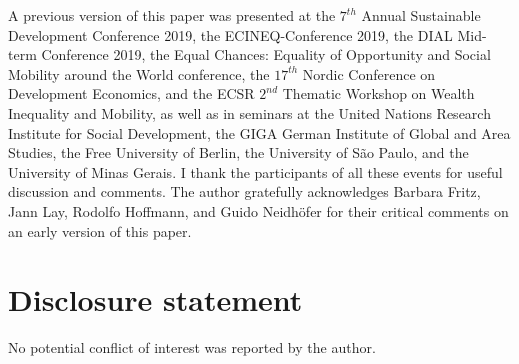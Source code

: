 \documentclass[a4paper, 12pt]{article}
\begin{document}
\footnotesize A previous version of this paper was presented at the $7^{th}$ Annual Sustainable Development Conference 2019, the ECINEQ-Conference 2019, the DIAL Mid-term Conference 2019, the Equal Chances: Equality of Opportunity and Social Mobility around the World conference, the $17^{th}$ Nordic Conference on Development Economics, and the ECSR $2^{nd}$ Thematic Workshop on Wealth Inequality and Mobility, as well as in seminars at the United Nations Research Institute for Social Development, the GIGA German Institute of Global and Area Studies, the Free University of Berlin, the University of São Paulo, and the University of Minas Gerais. I thank the participants of all these events for useful discussion and comments. The author gratefully acknowledges Barbara Fritz, Jann Lay, Rodolfo Hoffmann, and Guido Neidhöfer for their critical comments on an early version of this paper. 





\section*{Disclosure statement}

No potential conflict of interest was reported by the author.





\theendnotes



\let\oldthebibliography\thebibliography
\let\endoldthebibliography\endthebibliography
\renewenvironment{thebibliography}[1]{
  \begin{oldthebibliography}{#1}
    \setlength{\itemsep}{0em}
    \setlength{\parskip}{0em}
}
{
  \end{oldthebibliography}
}

{\footnotesize

}

\newpage
\end{document}
